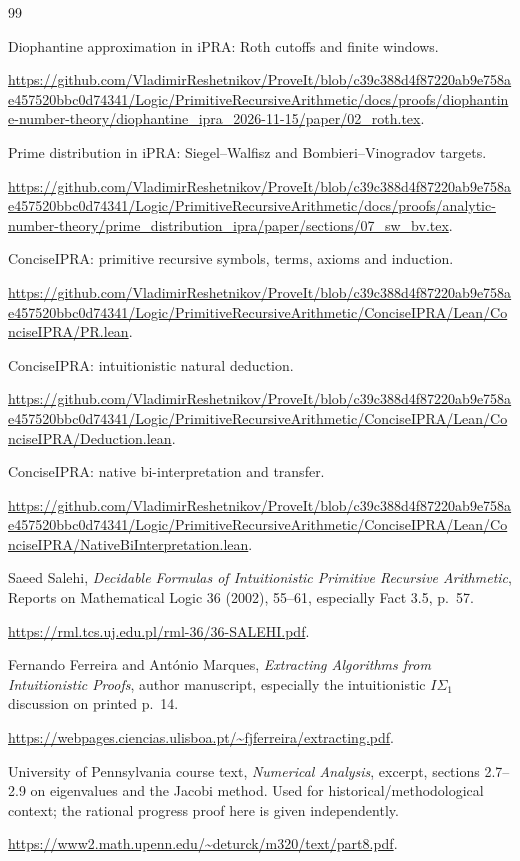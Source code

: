 \begin{thebibliography}{99}

Diophantine approximation in iPRA: Roth cutoffs and finite windows.

\url{https://github.com/VladimirReshetnikov/ProveIt/blob/c39c388d4f87220ab9e758ae457520bbc0d74341/Logic/PrimitiveRecursiveArithmetic/docs/proofs/diophantine-number-theory/diophantine_ipra_2026-11-15/paper/02_roth.tex}.


Prime distribution in iPRA: Siegel--Walfisz and Bombieri--Vinogradov targets.

\url{https://github.com/VladimirReshetnikov/ProveIt/blob/c39c388d4f87220ab9e758ae457520bbc0d74341/Logic/PrimitiveRecursiveArithmetic/docs/proofs/analytic-number-theory/prime_distribution_ipra/paper/sections/07_sw_bv.tex}.


ConciseIPRA: primitive recursive symbols, terms, axioms and induction.

\url{https://github.com/VladimirReshetnikov/ProveIt/blob/c39c388d4f87220ab9e758ae457520bbc0d74341/Logic/PrimitiveRecursiveArithmetic/ConciseIPRA/Lean/ConciseIPRA/PR.lean}.


ConciseIPRA: intuitionistic natural deduction.

\url{https://github.com/VladimirReshetnikov/ProveIt/blob/c39c388d4f87220ab9e758ae457520bbc0d74341/Logic/PrimitiveRecursiveArithmetic/ConciseIPRA/Lean/ConciseIPRA/Deduction.lean}.


ConciseIPRA: native bi-interpretation and transfer.

\url{https://github.com/VladimirReshetnikov/ProveIt/blob/c39c388d4f87220ab9e758ae457520bbc0d74341/Logic/PrimitiveRecursiveArithmetic/ConciseIPRA/Lean/ConciseIPRA/NativeBiInterpretation.lean}.


Saeed Salehi, \emph{Decidable Formulas of Intuitionistic Primitive Recursive Arithmetic}, Reports on Mathematical Logic 36 (2002), 55--61, especially Fact 3.5, p.~57.

\url{https://rml.tcs.uj.edu.pl/rml-36/36-SALEHI.pdf}.


Fernando Ferreira and Ant\'onio Marques, \emph{Extracting Algorithms from Intuitionistic Proofs}, author manuscript, especially the intuitionistic $I\Sigma_1$ discussion on printed p.~14.

\url{https://webpages.ciencias.ulisboa.pt/~fjferreira/extracting.pdf}.


University of Pennsylvania course text, \emph{Numerical Analysis}, excerpt, sections 2.7--2.9 on eigenvalues and the Jacobi method. Used for historical/methodological context; the rational progress proof here is given independently.

\url{https://www2.math.upenn.edu/~deturck/m320/text/part8.pdf}.

\end{thebibliography}

